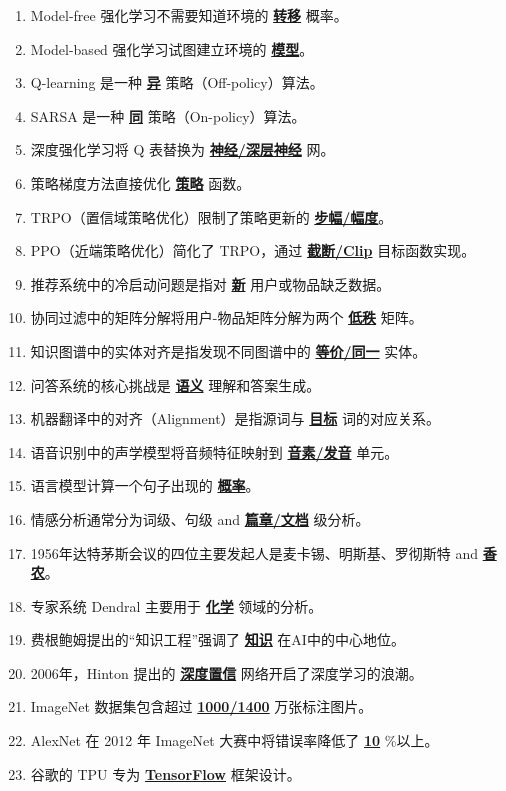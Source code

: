 \documentclass[12pt,a4paper,openany]{ctexbook}
\begin{document}
\begin{enumerate}[resume,leftmargin=2em,itemsep=1pt]
\item Model-free 强化学习不需要知道环境的 \underline{\textbf{转移}} 概率。
\item Model-based 强化学习试图建立环境的 \underline{\textbf{模型}}。
\item Q-learning 是一种 \underline{\textbf{异}} 策略（Off-policy）算法。
\item SARSA 是一种 \underline{\textbf{同}} 策略（On-policy）算法。
\item 深度强化学习将 Q 表替换为 \underline{\textbf{神经/深层神经}} 网。
\item 策略梯度方法直接优化 \underline{\textbf{策略}} 函数。
\item TRPO（置信域策略优化）限制了策略更新的 \underline{\textbf{步幅/幅度}}。
\item PPO（近端策略优化）简化了 TRPO，通过 \underline{\textbf{截断/Clip}} 目标函数实现。
\item 推荐系统中的冷启动问题是指对 \underline{\textbf{新}} 用户或物品缺乏数据。
\item 协同过滤中的矩阵分解将用户-物品矩阵分解为两个 \underline{\textbf{低秩}} 矩阵。
\item 知识图谱中的实体对齐是指发现不同图谱中的 \underline{\textbf{等价/同一}} 实体。
\item 问答系统的核心挑战是 \underline{\textbf{语义}} 理解和答案生成。
\item 机器翻译中的对齐（Alignment）是指源词与 \underline{\textbf{目标}} 词的对应关系。
\item 语音识别中的声学模型将音频特征映射到 \underline{\textbf{音素/发音}} 单元。
\item 语言模型计算一个句子出现的 \underline{\textbf{概率}}。
\item 情感分析通常分为词级、句级 and \underline{\textbf{篇章/文档}} 级分析。
\item 1956年达特茅斯会议的四位主要发起人是麦卡锡、明斯基、罗彻斯特 and \underline{\textbf{香农}}。
\item 专家系统 Dendral 主要用于 \underline{\textbf{化学}} 领域的分析。
\item 费根鲍姆提出的“知识工程”强调了 \underline{\textbf{知识}} 在AI中的中心地位。
\item 2006年，Hinton 提出的 \underline{\textbf{深度置信}} 网络开启了深度学习的浪潮。
\item ImageNet 数据集包含超过 \underline{\textbf{1000/1400}} 万张标注图片。
\item AlexNet 在 2012 年 ImageNet 大赛中将错误率降低了 \underline{\textbf{10}} \%以上。
\item 谷歌的 TPU 专为 \underline{\textbf{TensorFlow}} 框架设计。

\end{enumerate}
\end{document}
